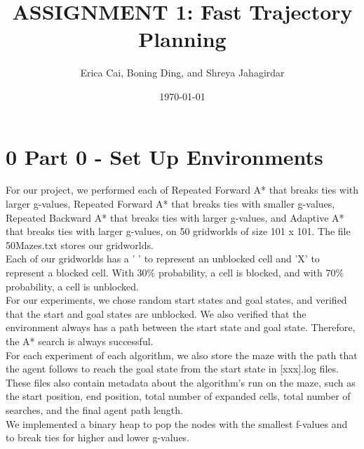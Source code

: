 \documentclass{article}
\title{ASSIGNMENT 1: Fast Trajectory Planning} %
\author{Erica Cai, Boning Ding, and Shreya Jahagirdar} %
\date{\today} %
\begin{document}
\maketitle %




\section*{0 Part 0 - Set Up Environments}

For our project, we performed each of Repeated Forward A* that breaks ties with larger g-values, Repeated Forward A* that breaks ties with smaller g-values, Repeated Backward A* that breaks ties with larger g-values, and Adaptive A* that breaks ties with larger g-values, on 50 gridworlds of size 101 x 101. The file 50Mazes.txt stores our gridworlds. \\

Each of our gridworlds has a ' ' to represent an unblocked cell and 'X' to represent a blocked cell. With 30\% probability, a cell is blocked, and with 70\% probability, a cell is unblocked. \\

For our experiments, we chose random start states and goal states, and verified that the start and goal states are unblocked. We also verified that the environment always has a path between the start state and goal state. Therefore, the A* search is always successful. \\

For each experiment of each algorithm, we also store the maze with the path that the agent follows to reach the goal state from the start state in [xxx].log files. These files also contain metadata about the algorithm's run on the maze, such as the start position, end position, total number of expanded cells, total number of searches, and the final agent path length. \\

We implemented a binary heap to pop the nodes with the smallest f-values and to break ties for higher and lower g-values.
\end{document}
